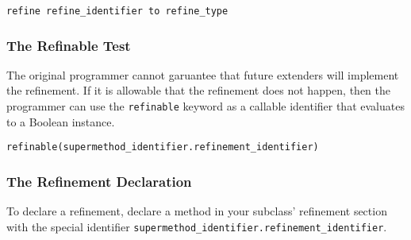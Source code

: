 \begin{lstlisting}
refine refine_identifier to refine_type
\end{lstlisting}

\subsubsection{The Refinable Test}
The original programmer cannot garuantee that future extenders will implement the refinement. If it is allowable that the refinement does not happen, then the programmer can use the \verb!refinable! keyword as a callable identifier that evaluates to a Boolean instance.

\begin{lstlisting}
refinable(supermethod_identifier.refinement_identifier)
\end{lstlisting}

\subsubsection{The Refinement Declaration}
To declare a refinement, declare a method in your subclass' refinement section with the special identifier \verb!supermethod_identifier.refinement_identifier!.